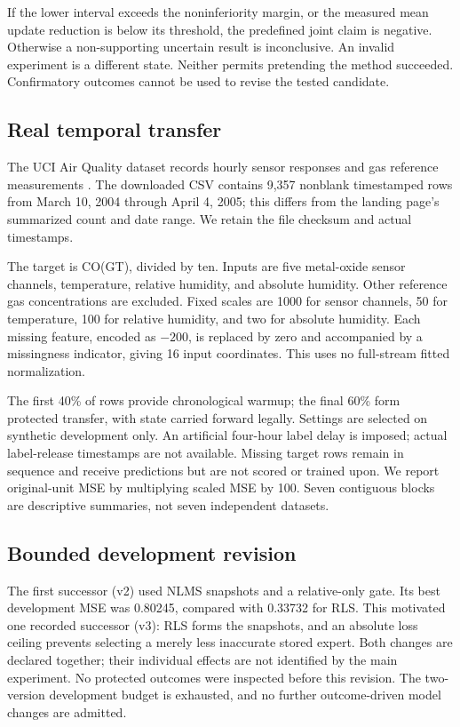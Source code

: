 \documentclass[10pt]{article}
\begin{document}
If the lower interval exceeds the noninferiority margin, or the measured mean update reduction is below its threshold, the predefined joint claim is negative. Otherwise a non-supporting uncertain result is inconclusive. An invalid experiment is a different state. Neither permits pretending the method succeeded. Confirmatory outcomes cannot be used to revise the tested candidate.

\subsection{Real temporal transfer}
The UCI Air Quality dataset records hourly sensor responses and gas reference measurements \cite{uci}. The downloaded CSV contains 9,357 nonblank timestamped rows from March 10, 2004 through April 4, 2005; this differs from the landing page's summarized count and date range. We retain the file checksum and actual timestamps.

The target is CO(GT), divided by ten. Inputs are five metal-oxide sensor channels, temperature, relative humidity, and absolute humidity. Other reference gas concentrations are excluded. Fixed scales are 1000 for sensor channels, 50 for temperature, 100 for relative humidity, and two for absolute humidity. Each missing feature, encoded as $-200$, is replaced by zero and accompanied by a missingness indicator, giving 16 input coordinates. This uses no full-stream fitted normalization.

The first 40\% of rows provide chronological warmup; the final 60\% form protected transfer, with state carried forward legally. Settings are selected on synthetic development only. An artificial four-hour label delay is imposed; actual label-release timestamps are not available. Missing target rows remain in sequence and receive predictions but are not scored or trained upon. We report original-unit MSE by multiplying scaled MSE by 100. Seven contiguous blocks are descriptive summaries, not seven independent datasets.

\subsection{Bounded development revision}
The first successor (v2) used NLMS snapshots and a relative-only gate. Its best development MSE was 0.80245, compared with 0.33732 for RLS. This motivated one recorded successor (v3): RLS forms the snapshots, and an absolute loss ceiling prevents selecting a merely less inaccurate stored expert. Both changes are declared together; their individual effects are not identified by the main experiment. No protected outcomes were inspected before this revision. The two-version development budget is exhausted, and no further outcome-driven model changes are admitted.
\end{document}
